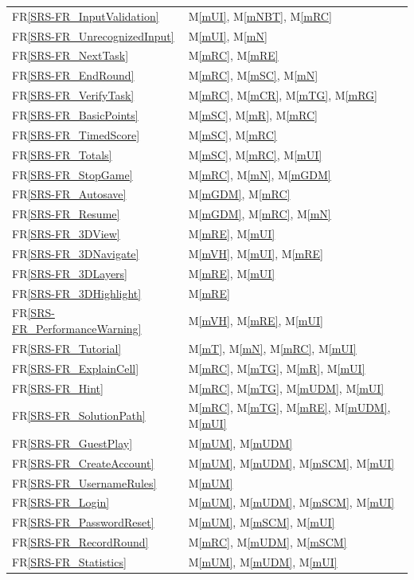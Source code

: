 \documentclass[12pt, titlepage]{article}
\newcommand{\rref}[1]{FR\ref{SRS-#1}}
\newcommand{\mref}[1]{M\ref{#1}}
\begin{document}
\begin{longtable}{p{} p{}}
\rref{FR_InputValidation} & \mref{mUI}, \mref{mNBT}, \mref{mRC}\\
\rref{FR_UnrecognizedInput} & \mref{mUI}, \mref{mN}\\
\rref{FR_NextTask} & \mref{mRC}, \mref{mRE}\\
\rref{FR_EndRound} & \mref{mRC}, \mref{mSC}, \mref{mN}\\
\rref{FR_VerifyTask} & \mref{mRC}, \mref{mCR}, \mref{mTG}, \mref{mRG}\\
\rref{FR_BasicPoints} & \mref{mSC}, \mref{mR}, \mref{mRC}\\
\rref{FR_TimedScore} & \mref{mSC}, \mref{mRC}\\
\rref{FR_Totals} & \mref{mSC}, \mref{mRC}, \mref{mUI}\\
\rref{FR_StopGame} & \mref{mRC}, \mref{mN}, \mref{mGDM}\\
\rref{FR_Autosave} & \mref{mGDM}, \mref{mRC}\\
\rref{FR_Resume} & \mref{mGDM}, \mref{mRC}, \mref{mN}\\
\rref{FR_3DView} & \mref{mRE}, \mref{mUI}\\
\rref{FR_3DNavigate} & \mref{mVH}, \mref{mUI}, \mref{mRE}\\
\rref{FR_3DLayers} & \mref{mRE}, \mref{mUI}\\
\rref{FR_3DHighlight} & \mref{mRE}\\
\rref{FR_PerformanceWarning} & \mref{mVH}, \mref{mRE}, \mref{mUI}\\
\rref{FR_Tutorial} & \mref{mT}, \mref{mN}, \mref{mRC}, \mref{mUI}\\
\rref{FR_ExplainCell} & \mref{mRC}, \mref{mTG}, \mref{mR}, \mref{mUI}\\
\rref{FR_Hint} & \mref{mRC}, \mref{mTG}, \mref{mUDM}, \mref{mUI}\\
\rref{FR_SolutionPath} & \mref{mRC}, \mref{mTG}, \mref{mRE}, \mref{mUDM}, \mref{mUI}\\
\rref{FR_GuestPlay} & \mref{mUM}, \mref{mUDM}\\
\rref{FR_CreateAccount} & \mref{mUM}, \mref{mUDM}, \mref{mSCM}, \mref{mUI}\\
\rref{FR_UsernameRules} & \mref{mUM}\\
\rref{FR_Login} & \mref{mUM}, \mref{mUDM}, \mref{mSCM}, \mref{mUI}\\
\rref{FR_PasswordReset} & \mref{mUM}, \mref{mSCM}, \mref{mUI}\\
\rref{FR_RecordRound} & \mref{mRC}, \mref{mUDM}, \mref{mSCM}\\
\rref{FR_Statistics} & \mref{mUM}, \mref{mUDM}, \mref{mUI}\\

\end{longtable}
\end{document}
